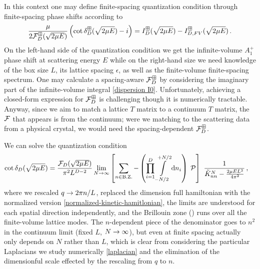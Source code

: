 In this context one may define finite-spacing quantization condition through finite-spacing phase shifts according to
\begin{equation}
    \frac{\mu}{2 \mathcal{F}_D^\boxplus(\sqrt{2\mu E})}\left(\cot\delta_D^\boxplus(\sqrt{2\mu E})-i\right)
    =
    I_D^{\boxplus}(\sqrt{2\mu E}) - I_{D,FV}^{\boxplus}(\sqrt{2\mu E})
	\, .
\end{equation}
On the left-hand side of the quantization condition we get the infinite-volume $A_1^+$ phase shift at scattering energy $E$ while on the right-hand size we need knowledge of the box size $L$, its lattice spacing $\epsilon$, as well as the finite-volume finite-spacing spectrum.
One may calculate a spacing-aware $\mathcal{F}_D^\boxplus$ by considering the imaginary part of the infinite-volume integral \eqref{dispersion I0}.
Unfortunately, achieving a closed-form expression for $\mathcal{F}_D^\boxplus$ is challenging though it is numerically tractable.
Anyway, since we aim to match a lattice $T$ matrix to a continuum $T$ matrix, the $\mathcal{F}$ that appears is from the continuum; were we matching to the scattering data from a physical crystal, we would need the spacing-dependent $\mathcal{F}_D^\boxplus$.

We can solve the quantization condition
\begin{align}
    \cot \delta_D(\sqrt{2 \mu E})
    &=
    \frac{\mathcal{F}_D(\sqrt{2 \mu E})}{\pi^2 L^{D-2}}
    \lim_{N\rightarrow\infty}
    \left[
    	\sum_{n\in\text{B.Z.}} -
		\left(\prod_{i=1}^D
    		\int\limits_{-N/2}^{+N/2}
    		\mathrm{d} n_i
    	\right)\; \mathcal{P}
	\right]\  \frac{1}{\tilde K_{nn}^{N}-\frac{2\mu E L^2}{4\pi^2}}
	\, ,
\end{align}
where we rescaled $q\rightarrow 2\pi n/L$, replaced the dimension full hamiltonian with the normalized version \eqref{normalized-kinetic-hamitlonian}, the limits are understood for each spatial direction independently, and the Brillouin zone (\BZ) runs over all the finite-volume lattice modes.
The $n$-dependent piece of the denominator goes to $n^2$ in the continuum limit (fixed $L$, $N\rightarrow\infty$), but even at finite spacing actually only depends on $N$ rather than $L$, which is clear from considering the particular Laplacians we study numerically \eqref{laplacian} and the elimination of the dimensionful scale effected by the rescaling from $q$ to $n$.

